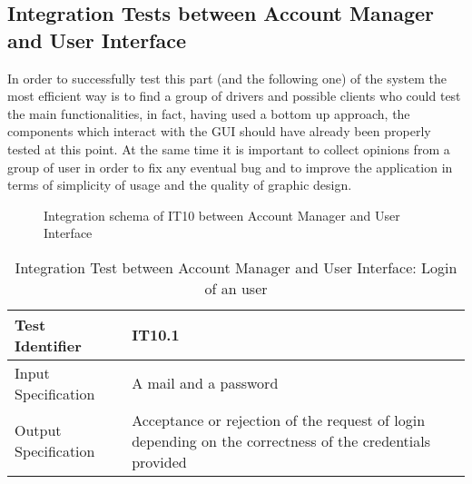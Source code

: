 \documentclass[a4paper]{article}
\begin{document}
\subsection{Integration Tests between Account Manager and User Interface}

In order to successfully test this part (and the following one) of the system the most efficient way is to find a group of drivers and possible clients who could test the main functionalities, in fact, having used a bottom up approach, the components which interact with the GUI should have already been properly tested at this point. At the same time it is important to collect opinions from a group of user in order to fix any eventual bug and to improve the application in terms of simplicity of usage and the quality of graphic design.

\begin{figure} [H]
\caption{Integration schema of IT10 between Account Manager and User Interface}
\end{figure}

\begin{table} [H]
\begin{center}
\begin{tabular}{| L | p{\rightcol} |}
  \hline
  Test Identifier & IT10.1 \\
  \hline
  Input Specification & A mail and a password\\
  \hline
  Output Specification & Acceptance or rejection of the request of login depending on the correctness of the credentials provided\\
  \hline
\end{tabular}
\end{center}
\caption{Integration Test between Account Manager and User Interface: Login of an user}
\end{table}
\end{document}
